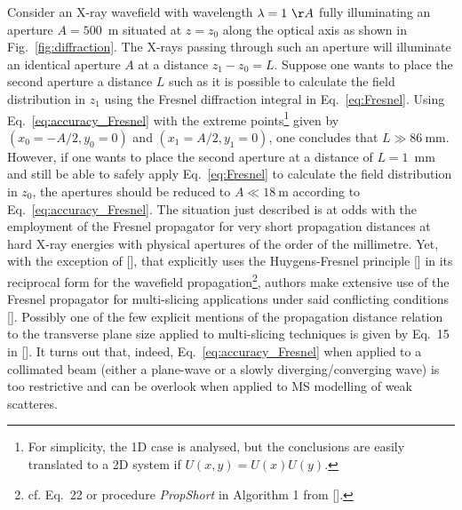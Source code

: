 \begin{refsection}
Consider an X-ray wavefield with wavelength $\lambda=1~\AA$ fully illuminating an aperture $A=500$~\textmu m situated at $z=z_0$ along the optical axis as shown in Fig.~\ref{fig:diffraction}. The X-rays passing through such an aperture will illuminate an identical aperture $A$ at a distance $z_1-z_0=L$. Suppose one wants to place the second aperture a distance $L$ such as it is possible to calculate the field distribution in $z_1$ using the Fresnel diffraction integral in Eq.~\ref{eq:Fresnel}. Using Eq.~\ref{eq:accuracy_Fresnel} with the extreme points\footnote{For simplicity, the 1D case is analysed, but the conclusions are easily translated to a 2D system if $U(x,y)=U(x)U(y)$.} given by $(x_0=-A/2, y_0=0)$ and $(x_1=A/2, y_1=0)$, one concludes that $ L\gg86~$mm. However, if one wants to place the second aperture at a distance of $L=1$~mm and still be able to safely apply Eq.~\ref{eq:Fresnel} to calculate the field distribution in $z_0$, the apertures should be reduced to $A\ll18~$\textmu m according to Eq.~\ref{eq:accuracy_Fresnel}. The situation just described is at odds with the employment of the Fresnel propagator for very short propagation distances at hard X-ray energies with physical apertures of the order of the millimetre. Yet, with the exception of [\cite{Ali2020}], that explicitly uses the Huygens-Fresnel principle [\cite[\textit{\S3.7}]{Goodman2017}] in its reciprocal form for the wavefield propagation\footnote{cf. Eq.~22 or procedure \textit{PropShort} in Algorithm 1 from [\cite{Ali2020}].}, authors make extensive use of the Fresnel propagator for multi-slicing applications under said conflicting conditions [\cite{Li2017, Munro2019, Celestre2020}]. Possibly one of the few explicit mentions of the propagation distance relation to the transverse plane size applied to multi-slicing techniques is given by Eq.~15 in [\cite{Ishizuka1977}]. It turns out that, indeed, Eq.~\ref{eq:accuracy_Fresnel} when applied to a collimated beam (either a plane-wave or a slowly diverging/converging wave) is too restrictive and can be overlook when applied to MS modelling of weak scatteres.


\end{refsection}
